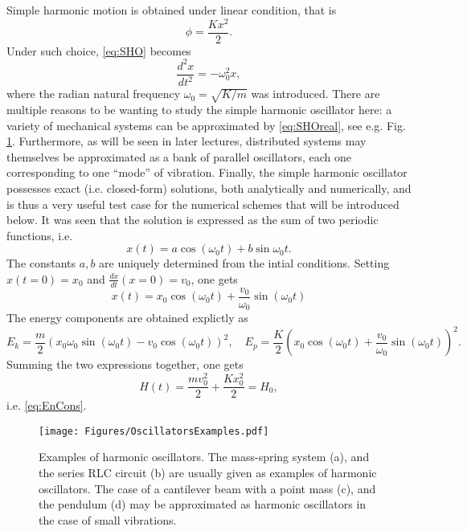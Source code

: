 Simple harmonic motion is obtained under linear condition, that is
\begin{equation}
    \phi = \frac{Kx^2}{2}.
\end{equation}
Under such choice, \eqref{eq:SHO} becomes
\begin{equation}\label{eq:SHOreal}
    \frac{d^2 x}{dt^2} = - \omega_0^2 x,
\end{equation}
where the radian natural frequency $\omega_0 = \sqrt{K/m}$ was introduced. There are multiple reasons to be wanting to study the simple harmonic oscillator here: a variety of mechanical systems can be approximated by \eqref{eq:SHOreal}, see e.g. Fig. \ref{fig:oscExamples}. Furthermore, as will be seen in later lectures, distributed systems may themselves be approximated as a bank of parallel oscillators, each one corresponding to one ``mode'' of vibration. Finally, the simple harmonic oscillator possesses exact (i.e. closed-form) solutions, both analytically and numerically, and is thus a very useful test case for the numerical schemes that will be introduced below. It was seen that the solution is expressed as the sum of two periodic functions, i.e.
\begin{equation}
    x(t) = a \cos(\omega_0 t) + b \sin{\omega_0 t}.
\end{equation}
The constants $a,b$ are uniquely determined from the intial conditions. Setting $x(t=0)=x_0$ and $\frac{dx}{dt}(x=0)=v_0$, one gets
\begin{equation}\label{eq:SHOexact}
    x(t) = x_0 \cos(\omega_0 t) + \frac{v_0}{\omega_0}\sin(\omega_0 t)
\end{equation}
The energy components are obtained explictly as
\begin{equation}
    E_k = \frac{m}{2}\left(x_0\omega_0\sin(\omega_0 t) - v_0 \cos(\omega_0 t) \right)^2, \quad E_p = \frac{K}{2}\left( x_0 \cos(\omega_0 t) + \frac{v_0}{\omega_0}\sin(\omega_0 t) \right)^2.
\end{equation}
Summing the two expressions together, one gets
\begin{equation}
    H(t) = \frac{m v_0^2}{2} + \frac{K x_0^2}{2} = H_0,
\end{equation}
i.e. \eqref{eq:EnCons}. 
\begin{figure}
    \texttt{[image: Figures/OscillatorsExamples.pdf]}
    \caption{Examples of harmonic oscillators. The mass-spring system (a), and the series RLC circuit (b) are usually given as examples of harmonic oscillators. The case of a cantilever beam with a point mass (c), and the pendulum (d) may  be approximated as harmonic oscillators in the case of small vibrations.}\label{fig:oscExamples}
\end{figure}



